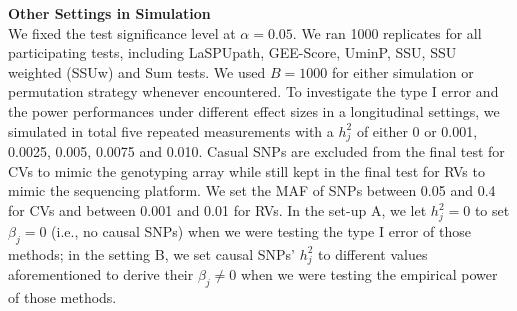 \documentclass[12pt]{article}
\begin{document}
\textbf{Other Settings in Simulation}\\
We fixed the test significance level at $\alpha = 0.05$. We ran 1000 replicates for all participating tests, including LaSPUpath, GEE-Score, UminP, SSU, SSU weighted (SSUw) and Sum tests. We used $B = 1000$ for either simulation or permutation strategy whenever encountered. To investigate the type I error and the power performances under different effect sizes in a longitudinal settings, we simulated in total five repeated measurements with a $h_j^2$ of either 0 or 0.001, 0.0025, 0.005, 0.0075 and 0.010. Casual SNPs are excluded from the final test for CVs to mimic the genotyping array while still kept in the final test for RVs to mimic the sequencing platform. We set the MAF of SNPs between 0.05 and 0.4 for CVs and between 0.001 and 0.01 for RVs. In the set-up A, we let $h_j^2 = 0$ to set $\beta_j = 0$ (i.e., no causal SNPs) when we were testing the type I error of those methods; in the setting B, we set causal SNPs' $h_j^2$ to different values aforementioned to derive their $\beta_j \neq 0$ when we were testing the empirical power of those methods. 


\end{document}
